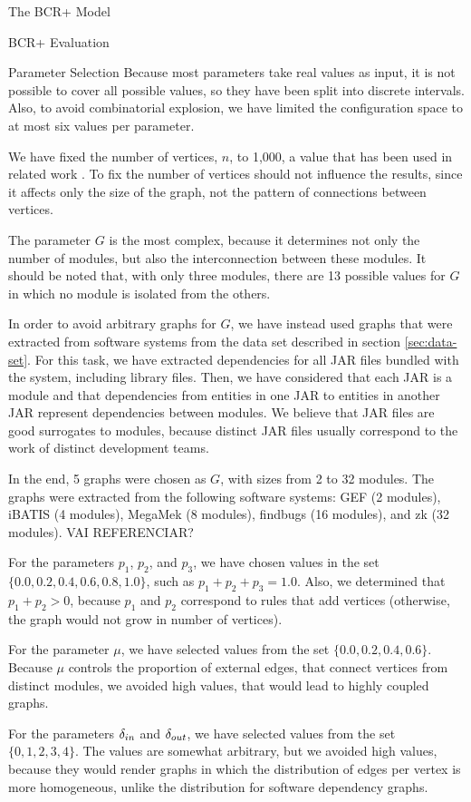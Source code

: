 \documentclass[11pt,twocolumn,a4paper,english]{article}
\begin{document}
\begin{section}{The BCR+ Model}
\begin{subsection}{BCR+ Evaluation}
\begin{subsubsection}{Parameter Selection}
	Because most parameters take real values as input, it is not possible to cover all possible values, so they have been split into discrete intervals. Also, to avoid combinatorial explosion, we have limited the configuration space to at most six values per parameter.
	
	We have fixed the number of vertices, $n$, to 1,000, a value that has been used in related work \cite{Lancichinetti2009b}. To fix the number of vertices should not influence the results, since it affects only the size of the graph, not the pattern of connections between vertices.
	
	The parameter $G$ is the most complex, because it determines not only the number of modules, but also the interconnection between these modules. It should be noted that, with only three modules, there are 13 possible values for $G$ in which no module is isolated from the others.
	
	In order to avoid arbitrary graphs for $G$, we have instead used graphs that were extracted from software systems from the data set described in section \ref{sec:data-set}. For this task, we have extracted dependencies for all JAR files bundled with the system, including library files. Then, we have considered that each JAR is a module and that dependencies from entities in one JAR to entities in another JAR represent dependencies between modules. We believe that JAR files are good surrogates to modules, because distinct JAR files usually correspond to the work of distinct development teams.
	
	In the end, 5 graphs were chosen as $G$, with sizes from 2 to 32 modules. The graphs were extracted from the following software systems: GEF (2 modules), iBATIS (4 modules), MegaMek (8 modules), findbugs (16 modules), and zk (32 modules). VAI REFERENCIAR?
	
	For the parameters $p_1$, $p_2$, and $p_3$, we have chosen values in the set $\{0.0, 0.2, 0.4, 0.6, 0.8, 1.0\}$, such as $p_1 + p_2 + p_3 = 1.0$. Also, we determined that $p_1 + p_2 > 0$, because $p_1$ and $p_2$ correspond to rules that add vertices (otherwise, the graph would not grow in number of vertices).
	
	For the parameter $\mu$, we have selected values from the set $\{0.0, 0.2, 0.4, 0.6\}$. Because $\mu$ controls the proportion of external edges, that connect vertices from distinct modules, we avoided high values, that would lead to highly coupled graphs.
	
	For the parameters $\delta_{in}$ and $\delta_{out}$, we have selected values from the set $\{0, 1, 2, 3, 4\}$. The values are somewhat arbitrary, but we avoided high values, because they would render graphs in which the distribution of edges per vertex is more homogeneous, unlike the distribution for software dependency graphs.
	

\end{subsubsection}
\end{subsection}
\end{section}
\end{document}
